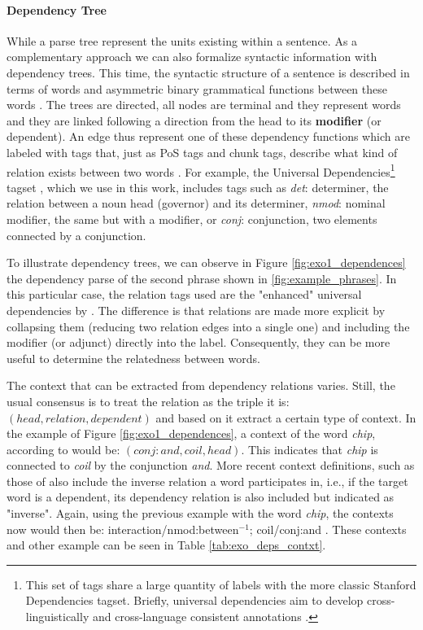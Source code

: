 \paragraph{Dependency Tree}
While  a parse tree represent the units existing within a sentence. As a complementary approach we can also formalize syntactic information with dependency trees. This time, the syntactic structure of a sentence is described in terms of words and asymmetric binary grammatical functions between these words   \cite{ClarkBook2010}. The trees are directed, all nodes are terminal and they represent words and they are linked following a direction from the head to its \textbf{modifier} (or dependent). An edge thus represent one of these dependency functions which are labeled  with tags that, just as PoS tags and chunk tags, describe what kind of relation exists between two words \cite{bird2006nltk}. For example, the Universal Dependencies\footnote{This set of tags share a large quantity of labels with the more classic Stanford Dependencies \cite{de2006generating,de2008stanford} tagset. Briefly, universal dependencies aim to develop cross-linguistically and cross-language consistent annotations  \cite{nivre2016universal}.} tagset \cite{nivre2016universal,schuster2016enhanced}, which we use in this work, includes tags such as  \textit{det}: determiner, the relation between a noun head (governor) and its determiner, \textit{nmod}: nominal modifier, the same but with a modifier, or \textit{conj}: conjunction, two elements connected by a conjunction.

To illustrate dependency trees, we can observe in Figure \ref{fig:exo1_dependences} the dependency parse of the second phrase shown in \ref{fig:example_phrases}. In this particular case, the relation tags used are the "enhanced" universal dependencies by \cite{schuster2016enhanced}. The difference is that relations are made more explicit by collapsing them (reducing two relation edges into a single one)  and including the modifier  (or adjunct) directly into the label. Consequently, they can be more useful to determine the relatedness between words.

The context that can be extracted from dependency relations varies. Still, the usual consensus is to treat the relation as the triple it is: $(head, relation, dependent)$ and based on it extract a certain type of context. In the example of Figure \ref{fig:exo1_dependences}, a context of the word  \textit{chip}, according to \cite{Lin1997} would be: $(conj:and,coil,head)$. This indicates that \textit{chip} is connected to \textit{coil} by the conjunction \textit{and}. More recent context definitions, such as those of \cite{baroni2010distributional,LevyG14,Panchenko2017} also include the inverse relation a word participates in, i.e., if the target word is a dependent, its dependency relation is also included but indicated as "inverse".  Again, using the previous example with the  word \textit{chip}, the  contexts now would then be: interaction/nmod:between$^{-1}$; coil/conj:and . These contexts and other example can be seen in Table \ref{tab:exo_deps_contxt}.

